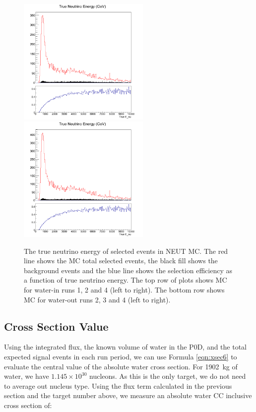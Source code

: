 \begin{figure}[h]
\includegraphics[width=2.5in]{Figures/TN100Plots/c_nuEair_3.png}
\includegraphics[width=2.5in]{Figures/TN100Plots/c_nuEair_4.png}
\caption{The true neutrino energy of selected events in NEUT MC. The red line shows the MC total selected events, the black fill shows the background events and the blue line shows the selection efficiency as a function of true neutrino energy. The top row of plots shows MC for water-in runs 1, 2 and 4 (left to right). The bottom row shows MC for water-out runs 2, 3 and 4 (left to right).}
\label{fig:nuEeff}
\end{figure}

\subsection{Cross Section Value}

Using the integrated flux, the known volume of water in the P0D, and the total expected signal events in each run period, we can use Formula \ref{eqn:xsec6} to evaluate the central value of the absolute water cross section. For 1902~kg of water, we have $1.145\times10^{30}$ nucleons. As this is the only target, we do not need to average out nucleus type. Using the flux term calculated in the previous section and the target number above, we measure an absolute water CC inclusive cross section of:

